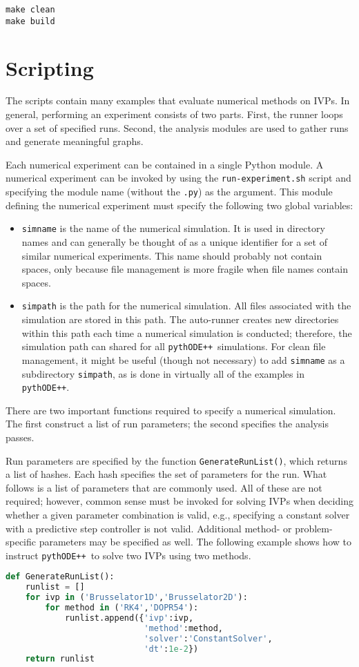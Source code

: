 \documentclass[11pt]{article}
\newcommand{\pypp}{\texttt{pythODE++}}
\begin{document}
\begin{verbatim}
make clean
make build
\end{verbatim}

\section{Scripting}

The scripts contain many examples that evaluate numerical methods on
IVPs. In general, performing an experiment consists of two
parts. First, the runner loops over a set of specified runs. Second,
the analysis modules are used to gather runs and generate
meaningful graphs.

Each numerical experiment can be contained in a single Python
module. A numerical experiment can be invoked by using the
\verb=run-experiment.sh= script and specifying the module name
(without the \verb=.py=) as the argument. This module defining the
numerical experiment must specify the following two global variables:
\begin{itemize}
\item \verb=simname= is the name of the numerical simulation. It is
  used in directory names and can generally be thought of as a unique
  identifier for a set of similar numerical experiments. This name
  should probably not contain spaces, only because file management is
  more fragile when file names contain spaces.
\item \verb=simpath= is the path for the numerical simulation. All
  files associated with the simulation are stored in this path. The
  auto-runner creates new directories within this path each time a
  numerical simulation is conducted; therefore, the simulation path
  can shared for all \pypp\ simulations. For clean file management, it
  might be useful (though not necessary) to add \verb=simname= as a
  subdirectory \verb=simpath=, as is done in virtually all of the
  examples in \pypp.
\end{itemize}

There are two important functions required to specify a numerical
simulation. The first construct a list of run parameters; the second
specifies the analysis passes.

Run parameters are specified by the function \verb=GenerateRunList()=,
which returns a list of hashes. Each hash specifies the set of
parameters for the run. What follows is a list of parameters that are
commonly used. All of these are not required; however, common sense
must be invoked for solving IVPs when deciding whether a given
parameter combination is valid, e.g., specifying a constant solver
with a predictive step controller is not valid. Additional method- or
problem-specific parameters may be specified as well. The following
example shows how to instruct \pypp\ to solve two IVPs using two
methods.
\begin{lstlisting}[tabsize=4,language=Python]
def GenerateRunList():
	runlist = []
	for ivp in ('Brusselator1D','Brusselator2D'):
		for method in ('RK4','DOPR54'):
			runlist.append({'ivp':ivp,
							'method':method,
							'solver':'ConstantSolver',
							'dt':1e-2})
	return runlist
\end{lstlisting}
\end{document}
